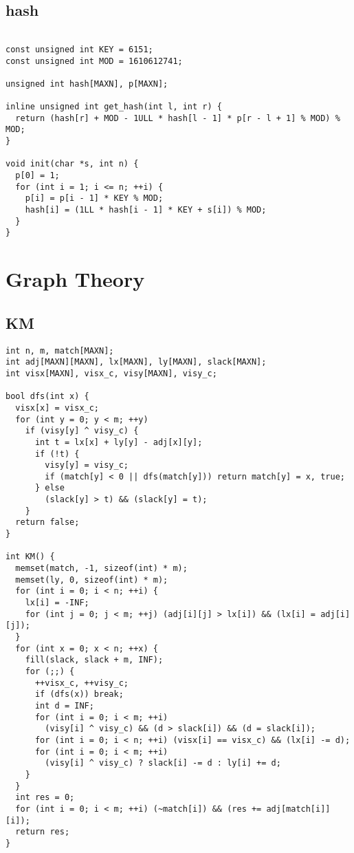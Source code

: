 \documentclass[twoside]{article}
\begin{document}
\subsection{hash}
\begin{lstlisting}

const unsigned int KEY = 6151;
const unsigned int MOD = 1610612741;

unsigned int hash[MAXN], p[MAXN];

inline unsigned int get_hash(int l, int r) {
  return (hash[r] + MOD - 1ULL * hash[l - 1] * p[r - l + 1] % MOD) % MOD;
}

void init(char *s, int n) {
  p[0] = 1;
  for (int i = 1; i <= n; ++i) {
    p[i] = p[i - 1] * KEY % MOD;
    hash[i] = (1LL * hash[i - 1] * KEY + s[i]) % MOD;
  }
}

\end{lstlisting}

\section{Graph Theory}

\subsection{KM}
\begin{lstlisting}
int n, m, match[MAXN];
int adj[MAXN][MAXN], lx[MAXN], ly[MAXN], slack[MAXN];
int visx[MAXN], visx_c, visy[MAXN], visy_c;

bool dfs(int x) {
  visx[x] = visx_c;
  for (int y = 0; y < m; ++y)
    if (visy[y] ^ visy_c) {
      int t = lx[x] + ly[y] - adj[x][y];
      if (!t) {
        visy[y] = visy_c;
        if (match[y] < 0 || dfs(match[y])) return match[y] = x, true;
      } else
        (slack[y] > t) && (slack[y] = t);
    }
  return false;
}

int KM() {
  memset(match, -1, sizeof(int) * m);
  memset(ly, 0, sizeof(int) * m);
  for (int i = 0; i < n; ++i) {
    lx[i] = -INF;
    for (int j = 0; j < m; ++j) (adj[i][j] > lx[i]) && (lx[i] = adj[i][j]);
  }
  for (int x = 0; x < n; ++x) {
    fill(slack, slack + m, INF);
    for (;;) {
      ++visx_c, ++visy_c;
      if (dfs(x)) break;
      int d = INF;
      for (int i = 0; i < m; ++i)
        (visy[i] ^ visy_c) && (d > slack[i]) && (d = slack[i]);
      for (int i = 0; i < n; ++i) (visx[i] == visx_c) && (lx[i] -= d);
      for (int i = 0; i < m; ++i)
        (visy[i] ^ visy_c) ? slack[i] -= d : ly[i] += d;
    }
  }
  int res = 0;
  for (int i = 0; i < m; ++i) (~match[i]) && (res += adj[match[i]][i]);
  return res;
}

\end{lstlisting}
\end{document}
